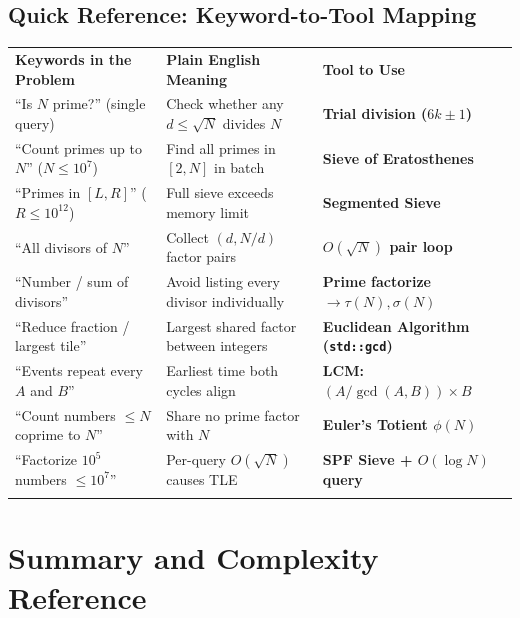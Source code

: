 \documentclass[11pt,a4paper]{article}
\theoremstyle{definition}
\begin{document}
\subsection*{Quick Reference: Keyword-to-Tool Mapping}

\begingroup\small{}
\begin{tabularx}{\textwidth}{>{\raggedright\arraybackslash}p{4.3cm} >{\raggedright\arraybackslash}X >{\raggedright\arraybackslash\bfseries}p{4.1cm}}
\arrayrulecolor{primaryblue}\toprule[1.2pt]
\rowcolor{primaryblue!10}
\textcolor{primaryblue}{\textbf{Keywords in the Problem}} & \textcolor{primaryblue}{\textbf{Plain English Meaning}} & \textcolor{primaryblue}{\textbf{Tool to Use}} \\
\arrayrulecolor{codeframe}\midrule[0.6pt]
``Is $N$ prime?'' (single query) & Check whether any $d \le \sqrt{N}$ divides $N$ & Trial division ($6k \pm 1$) \\
``Count primes up to $N$'' ($N \le 10^7$) & Find all primes in $[2, N]$ in batch & Sieve of Eratosthenes \\
``Primes in $[L, R]$'' ($R \le 10^{12}$) & Full sieve exceeds memory limit & Segmented Sieve \\
``All divisors of $N$'' & Collect $(d, N/d)$ factor pairs & $O(\sqrt{N})$ pair loop \\
``Number / sum of divisors'' & Avoid listing every divisor individually & Prime factorize $\to \tau(N), \sigma(N)$ \\
``Reduce fraction / largest tile'' & Largest shared factor between integers & Euclidean Algorithm (\texttt{std::gcd}) \\
``Events repeat every $A$ and $B$'' & Earliest time both cycles align & LCM: $(A / \gcd(A,B)) \times B$ \\
``Count numbers $\le N$ coprime to $N$'' & Share no prime factor with $N$ & Euler's Totient $\phi(N)$ \\
``Factorize $10^5$ numbers $\le 10^7$'' & Per-query $O(\sqrt{N})$ causes TLE & SPF Sieve + $O(\log N)$ query \\
\arrayrulecolor{primaryblue}\bottomrule[1.2pt]
\end{tabularx}\endgroup

\section{Summary and Complexity Reference}
\end{document}
